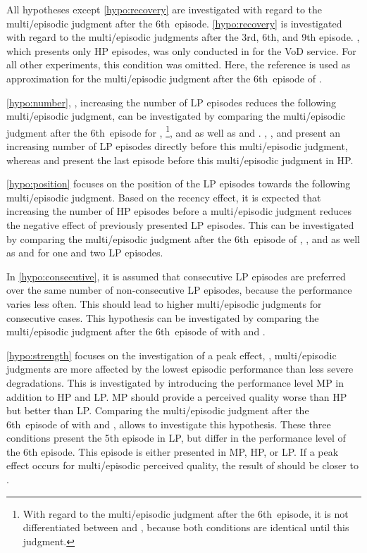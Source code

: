 All hypotheses except \autoref{hypo:recovery} are investigated with regard to the multi\-/episodic judgment after the 6th~episode.
\autoref{hypo:recovery} is investigated with regard to the multi\-/episodic judgments after the 3rd, 6th, and 9th episode.
, which presents only \ac{HP} episodes, was only conducted in \EIIb{} for the \ac{VoD} service.
For all other experiments, this condition was omitted.
Here, the reference is used as approximation for the multi\-/episodic judgment after the 6th~episode of .

\autoref{hypo:number}, \ie, increasing the number of \ac{LP} episodes reduces the following multi\-/episodic judgment, can be investigated by comparing the multi\-/episodic judgment after the 6th~episode for , \footnote{With regard to the multi\-/episodic judgment after the 6th~episode, it is not differentiated between \CVa{} and \CVb{}, because both conditions are identical until this judgment.}, and  as well as \CIIa{} and .
, , and  present an increasing number of \ac{LP} episodes directly before this multi\-/episodic judgment, whereas \CIIa{} and  present the last episode before this multi\-/episodic judgment in \ac{HP}.

\autoref{hypo:position} focuses on the position of the \ac{LP} episodes towards the following multi\-/episodic judgment.
Based on the recency effect, it is expected that increasing the number of \ac{HP} episodes before a multi\-/episodic judgment reduces the negative effect of previously presented \ac{LP} episodes.
This can be investigated by comparing the multi\-/episodic judgment after the 6th~episode of , \CIIa{}, and  as well as  and  for one and two \ac{LP} episodes.

In \autoref{hypo:consecutive}, it is assumed that consecutive \ac{LP} episodes are preferred over the same number of non-consecutive \ac{LP} episodes, because the performance varies less often.
This should lead to higher multi\-/episodic judgments for consecutive cases.
This hypothesis can be investigated by comparing the multi\-/episodic judgment after the 6th~episode of  with  and .

\autoref{hypo:strength} focuses on the investigation of a peak effect, \ie, multi\-/episodic judgments are more affected by the lowest episodic performance than less severe degradations. 
This is investigated by introducing the performance level \ac{MP} in addition to \ac{HP} and \ac{LP}.
\ac{MP} should provide a perceived quality worse than \ac{HP} but better than \ac{LP}.
Comparing the multi\-/episodic judgment after the 6th~episode of  with  and \CIIa{}, allows to investigate this hypothesis.
These three conditions present the 5th episode in \ac{LP}, but differ in the performance level of the 6th episode.
This episode is either presented in \ac{MP}, \ac{HP}, or \ac{LP}.
If a peak effect occurs for multi\-/episodic perceived quality, the result of  should be closer to \CIIa{}.


